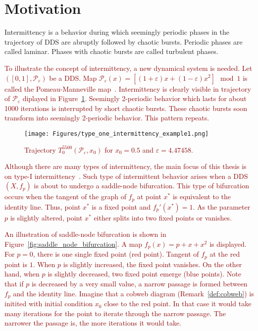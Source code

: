 \section{Motivation}
Intermittency is a behavior during which seemingly periodic phases in the trajectory of DDS are abruptly followed by chaotic bursts.
Periodic phases are called laminar.
Phases with chaotic bursts are called turbulent phases.
\par
\textcolor{darkred}{
To illustrate the concept of intermittency, a new dynamical system is needed.
Let $([0, 1], \mathcal{P}_{\varepsilon})$ be a DDS.
Map $\mathcal{P}_{\varepsilon}(x) = \left[ (1+\varepsilon)x+(1-\varepsilon)x^2 \right] \mod{1}$ is called the Pomeau-Manneville map~\cite{Manneville1980,Datseris2022}.
Intermittency is clearly visible in trajectory of $\mathcal{P}_{\varepsilon}$ diplayed in Figure~\ref{fig:intermittent_trajectory_example}.
Seemingly 2-periodic behavior which lasts for about 1000 iterations is interrupted by short chaotic bursts.
These chaotic bursts soon transform into seemingly 2-periodic behavior.
This pattern repeats.
}

\begin{figure}[!h]
    \centering
    \texttt{[image: Figures/type\_one\_intermittency\_example1.png]}
    \caption{
        \textcolor{darkred}{
        Trajectory $T^{5500}_{0}(\mathcal{P}_{\varepsilon}, x_0)$ for $x_0 = 0.5$ and $\varepsilon = 4.47458$.
        }
    }
    \label{fig:intermittent_trajectory_example}
\end{figure}

\textcolor{darkred}{
Although there are many types of intermittency, the main focus of this thesis is on type-I intermittency~\cite{Pomeau1980,Bussac1982,DelRio2014}.
Such type of intermittent behavior arises when a DDS $(X, f_{p})$ is about to undergo a saddle-node bifurcation.
This type of bifurcation occurs when the tangent of the graph of $f_{p}$ at point $x^{*}$ is equivalent to the identity line.
Thus, point $x^{*}$ is a fixed point and $f_{p}'(x^{*}) = 1$.
As the parameter $p$ is slightly altered, point $x^{*}$ either splits into two fixed points or vanishes.
}
\par
\textcolor{darkred}{
An illustration of saddle-node bifurcation is shown in Figure~\ref{fig:saddle_node_bifurcation}.
A map $f_{p}(x) = p + x + x^2$ is displayed.
For $p = 0$, there is one single fixed point (red point).
Tangent of $f_{p}$ at the red point is $1$.
When $p$ is slightly increased, the fixed point vanishes.
On the other hand, when $p$ is slightly decreased, two fixed point emerge (blue points).
Note that if $p$ is decreased by a very small value, a narrow passage is formed between $f_{p}$ and the identity line.
Imagine that a cobweb diagram (Remark~\ref{def:cobweb}) is initited with initial condition $x_0$ close to the red point.
In that case it would take many iterations for the point to iterate through the narrow passage.
The narrower the passage is, the more iterations it would take.
}

